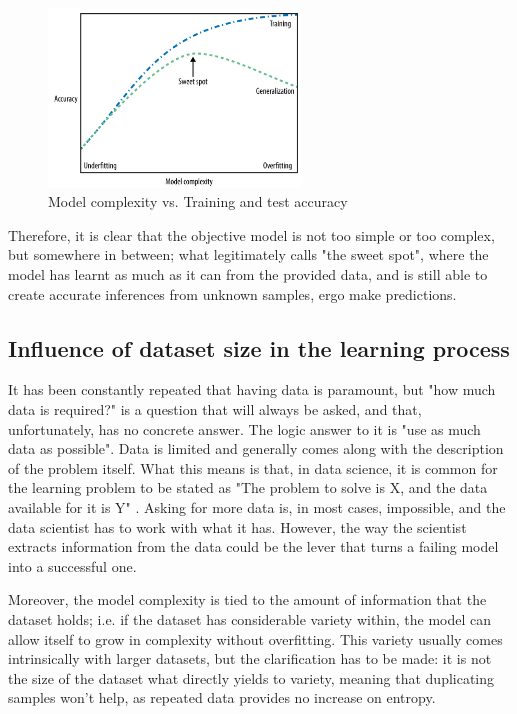 \begin{figure}[!htb]
    \centering
      \includegraphics[width=0.6\textwidth]{figures/model_complexity}
      \caption{Model complexity vs. Training and test accuracy \cite{Andreas}}
      \label{fig:model_complexity}
\end{figure}

Therefore, it is clear that the objective model is not too simple or too complex, but somewhere in between; what \cite{Andreas} legitimately calls "the sweet spot", where the model has learnt as much as it can from the provided data, and is still able to create accurate inferences from unknown samples, ergo make predictions.


\subsection{Influence of dataset size in the learning process}\label{ch:size}
It has been constantly repeated that having data is paramount, but "how much data is required?" is a question that will always be asked, and that, unfortunately, has no concrete answer. The logic answer to it is "use as much data as possible". Data is limited and generally comes along with the description of the problem itself. What this means is that, in data science, it is common for the learning problem to be stated as "The problem to solve is X, and the data available for it is Y" \cite{Yaser}. Asking for more data is, in most cases, impossible, and the data scientist has to work with what it has. However, the way the scientist extracts information from the data could be the lever that turns a failing model into a successful one.

Moreover, the model complexity is tied to the amount of information that the dataset holds; i.e. if the dataset has considerable variety within, the model can allow itself to grow in complexity without overfitting. This variety usually comes intrinsically with larger datasets, but the clarification has to be made: it is not the size of the dataset what directly yields to variety, meaning that duplicating samples won't help, as repeated data provides no increase on entropy.

